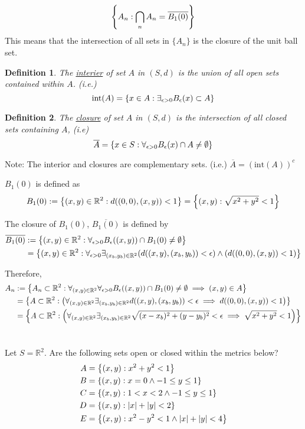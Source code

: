 \documentclass[]{article}
\newcommand{\R}{\mathbb{R}}
\newtheorem{definition}{Definition}
\begin{document}
$$\qty{A_n : \bigcap_n A_n = \overline{B_1(0)}}$$
This means that the intersection of all sets in $\{A_n\}$ 
is the closure of the unit ball set.

\begin{definition}
    The \underline{interier} of set $A$ in $(S,d)$ is the union of all open sets 
    contained within $A$. (i.e.)
    $$\text{int}(A) = \qty{x \in A : \exists_{\epsilon>0} B_\epsilon(x) \subset A}$$
\end{definition}

\begin{definition}
    The \underline{closure} of set $A$ in $(S,d)$ is the intersection of all closed sets 
    containing $A$, (i.e) 
    $$\overline{A} = \qty{x \in S : 
        \forall_{\epsilon> 0} B_\epsilon(x) \cap A \neq \emptyset}$$
\end{definition}
Note: 
The interior and closures are complementary sets. (i.e.) $\overline{A} = (\text{int}(A))^c$


$B_1(0)$ is defined as 
$$B_1(0) := \qty{(x,y) \in \R^2 : d((0,0),(x,y)) < 1} = \qty{(x,y) : \sqrt{x^2 + y^2} < 1}$$

The closure of $B_1(0)$, $\overline{B_1(0)}$ is defined by
\begin{align*}
    \overline{B_1(0)} &:= \qty{(x,y) \in \R^2 : 
        \forall_{\epsilon > 0} B_\epsilon((x,y)) \cap B_1(0) \neq \emptyset}\\
    &= \qty{(x,y) \in \R^2 : \forall_{\epsilon> 0} 
        \exists_{(x_b,y_b) \in \R^2} (d((x,y),(x_b,y_b)) < \epsilon) \land (d((0,0),(x,y)) < 1)}
\end{align*}

Therefore,
\begin{align*}
    {A_n} &:= \qty{A_n \subset \R^2: \forall_{(x,y) \in \R^2} \forall_{\epsilon> 0} 
        B_\epsilon((x,y)) \cap B_1(0) \neq \emptyset \implies (x,y) \in A}\\
    &= \qty{A \subset \R^2: \qty(\forall_{(x,y) \in \R^2} 
        \exists_{(x_b,y_b) \in \R^2} d((x,y),(x_b,y_b)) < \epsilon \implies d((0,0),(x,y)) < 1)}\\
    &= \qty{A \subset \R^2: \qty(\forall_{(x,y) \in \R^2} 
        \exists_{(x_b,y_b) \in \R^2} \sqrt{(x-x_b)^2 + (y-y_b)^2} < \epsilon 
        \implies \sqrt{x^2 + y^2} < 1)}\\
\end{align*}

\newpage
\section{}
Let $S = \R^2$. Are the following sets open or closed within the metrics below?
\begin{align*}
    A &= \qty{(x,y) : x^2 + y^2 < 1}\\
    B &= \qty{(x,y) : x = 0 \land -1 \leq y \leq 1}\\
    C &= \qty{(x,y) : 1 < x < 2 \land -1 \leq y \leq 1}\\
    D &= \qty{(x,y) : \abs{x} + \abs{y} < 2}\\
    E &= \qty{(x,y) : x^2 - y^2 < 1 \land \abs{x} + \abs{y} < 4}
\end{align*}
\end{document}
